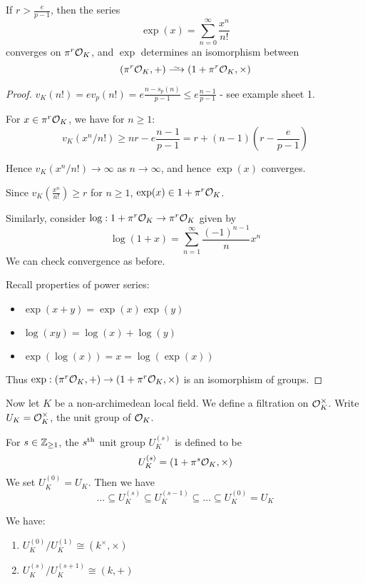 \documentclass[10pt,a4paper]{article}
\begin{document}
\begin{proposition}
  If $r > \frac{e}{p-1}$, then the series
  \[\exp(x) = \sum_{n=0}^\infty \frac{x^n}{n!}\]
  converges on $\pi^r\mathcal{O}_K$, and $\exp$ determines an isomorphism between
  \[(\pi^r\O_K, +) \isomarrow (1+\pi^r\O_K, \times)\]
\end{proposition}
\begin{proof}
  $v_K(n!) = ev_p(n!) = e\frac{n-s_p(n)}{p-1} \leq e\frac{n-1}{p-1}$ - see example sheet 1.

  For $x \in \pi^r\mathcal{O}_K$, we have for $n \geq 1$:
  \[v_K(x^n/n!) \geq nr - e \frac{n-1}{p-1} = r+(n-1)\left(r-\frac{e}{p-1}\right)\]

  Hence $v_K(x^n/n!) \to \infty$ as $n \to \infty$, and hence $\exp(x)$ converges.

  Since $v_K\left(\frac{x^n}{n!}\right) \geq r$ for $n\geq 1$, $\exp(x) \in 1+\pi^r \mathcal{O}_K$.

  Similarly, consider $\log:1+\pi^r \mathcal{O}_K \to \pi^r\mathcal{O}_K$ given by
  \[\log(1+x) = \sum_{n=1}^\infty \frac{(-1)^{n-1}}{n}x^n\]
  We can check convergence as before.

  Recall properties of power series:
  \begin{itemize}
    \item $\exp(x+y) = \exp(x)\exp(y)$
    \item $\log(xy) = \log(x)+\log(y)$
    \item $\exp(\log(x)) = x = \log(\exp(x))$
  \end{itemize}
  Thus $\exp:(\pi^r \mathcal{O}_K, +) \to (1+\pi^r\mathcal{O}_K, \times)$ is an isomorphism of groups.
\end{proof}
Now let $K$ be a non-archimedean local field. We define a filtration on $\mathcal{O}_K^\times$. Write $U_K = \mathcal{O}_K^\times$, the unit group of $\mathcal{O}_K$.
\begin{definition}
  For $s \in \mathbb{Z}_{\geq 1}$, the $s\textsuperscript{th}$ unit group $U_K^{(s)}$ is defined to be
  \[U_K^{(s)} = (1+\pi^s\mathcal{O}_K, \times)\]
  We set $U_K^{(0)} = U_K$. Then we have
  \[\ldots \subseteq U_K^{(s)} \subseteq U_K^{(s-1)} \subseteq \ldots \subseteq U_K^{(0)} = U_K\]
\end{definition}
\begin{proposition}
  We have:
  \begin{enumerate}
    \item $U_K^{(0)}/U_K^{(1)} \cong (k^\times, \times)$
    \item $U_K^{(s)}/U_K^{(s+1)} \cong (k, +)$
  \end{enumerate}
\end{proposition}
\end{document}
